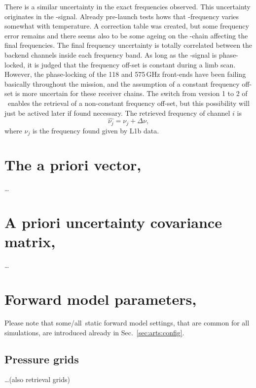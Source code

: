 There is a similar uncertainty in the exact frequencies observed. This
uncertainty originates in the \LO-signal. Already pre-launch tests hows that
\LO-frequency varies somewhat with temperature. A correction table was created,
but some frequency error remains and there seems also to be some ageing on the
\LO-chain affecting the final frequencies. The final frequency uncertainty is
totally correlated between the backend channels inside each frequency band. As
long as the \LO-signal is phase-locked, it is judged that the frequency off-set
is constant during a limb scan. However, the phase-locking of the 118 and
575\,GHz front-ends have been failing basically throughout the mission, and the
assumption of a constant frequency off-set is more uncertain for these receiver
chains. The switch from version 1 to 2 of \ARTS\ enables the retrieval of a
non-constant frequency off-set, but this possibility will just be actived later
if found necessary. The retrieved frequency of channel $i$ is
\begin{equation}
  \label{eq:retr:freq}
  \hat{\nu_j} = \nu_j + \Delta\nu,  
\end{equation}
where $\nu_j$ is the frequency found given by L1b data.




\section{The a priori vector, }
\label{sec:xa}
%
\dots


\section{A priori uncertainty covariance matrix, }
\label{sec:Sa}
%
\dots



\section{Forward model parameters, \FrwMdlVct}
\label{sec:b}
%
Please note that some/all\ static forward
model settings, that are common for all simulations, are introduced already in
Sec.~\ref{sec:arts:config}.

\subsection{Pressure grids}
\label{sec:b:pgrid}
%
\dots (also retrieval grids)


